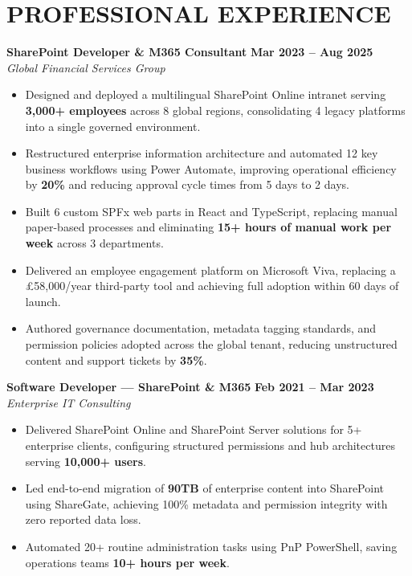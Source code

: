 \documentclass[11pt,a4paper]{article}
\begin{document}
\section*{PROFESSIONAL EXPERIENCE}

\textbf{SharePoint Developer \& M365 Consultant} \hfill \textbf{Mar 2023 -- Aug 2025} \\
\textit{Global Financial Services Group}
\begin{itemize}
    \item Designed and deployed a multilingual SharePoint Online intranet serving \textbf{3,000+ employees} across 8 global regions, consolidating 4 legacy platforms into a single governed environment.
    \item Restructured enterprise information architecture and automated 12 key business workflows using Power Automate, improving operational efficiency by \textbf{20\%} and reducing approval cycle times from 5 days to 2 days.
    \item Built 6 custom SPFx web parts in React and TypeScript, replacing manual paper-based processes and eliminating \textbf{15+ hours of manual work per week} across 3 departments.
    \item Delivered an employee engagement platform on Microsoft Viva, replacing a \pounds58,000/year third-party tool and achieving full adoption within 60 days of launch.
    \item Authored governance documentation, metadata tagging standards, and permission policies adopted across the global tenant, reducing unstructured content and support tickets by \textbf{35\%}.
\end{itemize}
\vspace{8pt}

\textbf{Software Developer --- SharePoint \& M365} \hfill \textbf{Feb 2021 -- Mar 2023} \\
\textit{Enterprise IT Consulting}
\begin{itemize}
    \item Delivered SharePoint Online and SharePoint Server solutions for 5+ enterprise clients, configuring structured permissions and hub architectures serving \textbf{10,000+ users}.
    \item Led end-to-end migration of \textbf{90TB} of enterprise content into SharePoint using ShareGate, achieving 100\% metadata and permission integrity with zero reported data loss.
    \item Automated 20+ routine administration tasks using PnP PowerShell, saving operations teams \textbf{10+ hours per week}.
\end{itemize}
\end{document}
